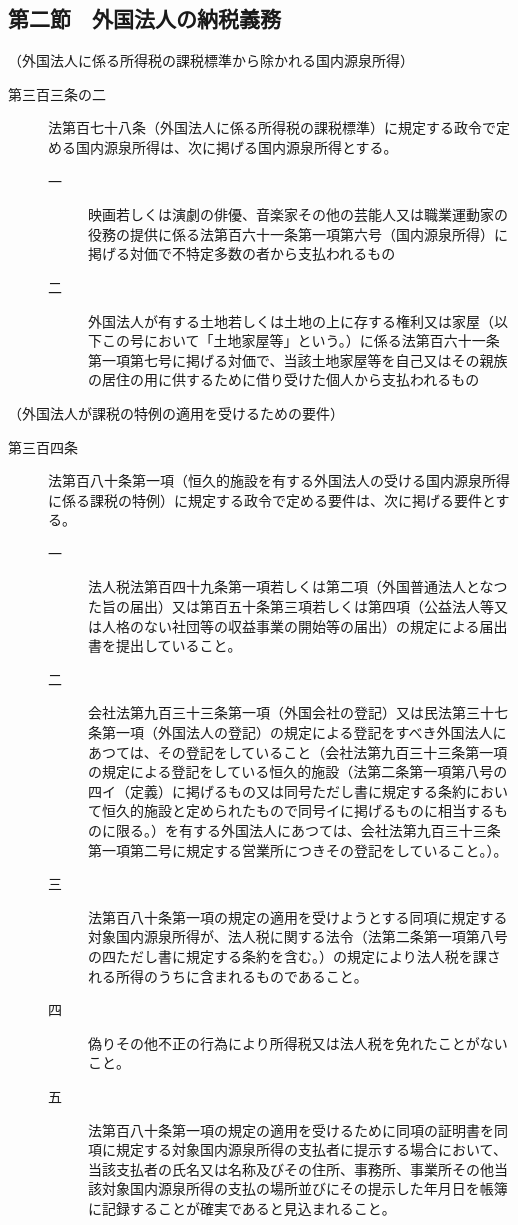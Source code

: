 \documentclass[twocolumn,a4j,10pt]{ltjtarticle}
\begin{document}
\subsection*{第二節　外国法人の納税義務}
\noindent\hspace{10pt}（外国法人に係る所得税の課税標準から除かれる国内源泉所得）
\begin{description}
\item[第三百三条の二]法第百七十八条（外国法人に係る所得税の課税標準）に規定する政令で定める国内源泉所得は、次に掲げる国内源泉所得とする。
\begin{description}
\item[一]映画若しくは演劇の俳優、音楽家その他の芸能人又は職業運動家の役務の提供に係る法第百六十一条第一項第六号（国内源泉所得）に掲げる対価で不特定多数の者から支払われるもの
\item[二]外国法人が有する土地若しくは土地の上に存する権利又は家屋（以下この号において「土地家屋等」という。）に係る法第百六十一条第一項第七号に掲げる対価で、当該土地家屋等を自己又はその親族の居住の用に供するために借り受けた個人から支払われるもの
\end{description}
\end{description}
\noindent\hspace{10pt}（外国法人が課税の特例の適用を受けるための要件）
\begin{description}
\item[第三百四条]法第百八十条第一項（恒久的施設を有する外国法人の受ける国内源泉所得に係る課税の特例）に規定する政令で定める要件は、次に掲げる要件とする。
\begin{description}
\item[一]法人税法第百四十九条第一項若しくは第二項（外国普通法人となつた旨の届出）又は第百五十条第三項若しくは第四項（公益法人等又は人格のない社団等の収益事業の開始等の届出）の規定による届出書を提出していること。
\item[二]会社法第九百三十三条第一項（外国会社の登記）又は民法第三十七条第一項（外国法人の登記）の規定による登記をすべき外国法人にあつては、その登記をしていること（会社法第九百三十三条第一項の規定による登記をしている恒久的施設（法第二条第一項第八号の四イ（定義）に掲げるもの又は同号ただし書に規定する条約において恒久的施設と定められたもので同号イに掲げるものに相当するものに限る。）を有する外国法人にあつては、会社法第九百三十三条第一項第二号に規定する営業所につきその登記をしていること。）。
\item[三]法第百八十条第一項の規定の適用を受けようとする同項に規定する対象国内源泉所得が、法人税に関する法令（法第二条第一項第八号の四ただし書に規定する条約を含む。）の規定により法人税を課される所得のうちに含まれるものであること。
\item[四]偽りその他不正の行為により所得税又は法人税を免れたことがないこと。
\item[五]法第百八十条第一項の規定の適用を受けるために同項の証明書を同項に規定する対象国内源泉所得の支払者に提示する場合において、当該支払者の氏名又は名称及びその住所、事務所、事業所その他当該対象国内源泉所得の支払の場所並びにその提示した年月日を帳簿に記録することが確実であると見込まれること。
\end{description}
\end{description}
\end{document}
